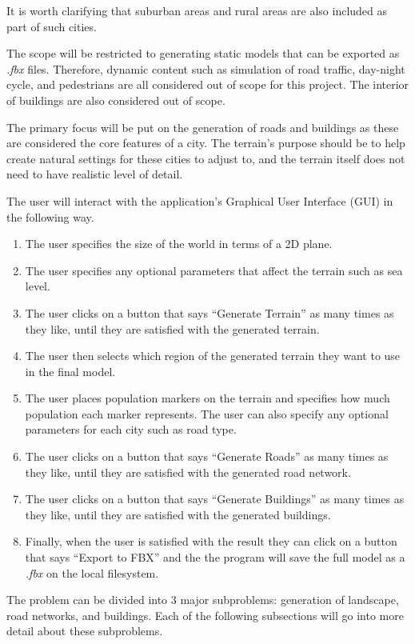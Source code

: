 It is worth clarifying that suburban areas and rural areas are also included as
part of such cities.

The scope will be restricted to generating static models that can be exported as \textit{.fbx} files.
Therefore, dynamic content such as simulation of road traffic, day-night cycle,
and pedestrians are all considered out of scope for this project.
The interior of buildings are also considered out of scope.

The primary focus will be put on the generation of roads and buildings as these
are considered the core features of a city.
The terrain's purpose should be to help create natural
settings for these cities to adjust to, and the terrain itself does not need
to have realistic level of detail.

The user will interact with the application's Graphical User Interface (GUI) in the following way.
\begin{enumerate}
  \item The user specifies the size of the world in terms of a 2D plane.
  \item The user specifies any optional parameters that affect the terrain
    such as sea level.
  \item The user clicks on a button that says ``Generate Terrain'' as many times
    as they like, until they are satisfied with the generated terrain.
  \item The user then selects which region of the generated terrain they want to use in the final model.
  \item The user places population markers on the terrain and specifies how much
    population each marker represents. The user can also specify any optional
    parameters for each city such as road type.
  \item The user clicks on a button that says ``Generate Roads'' as many times
    as they like, until they are satisfied with the generated road network.
  \item The user clicks on a button that says ``Generate Buildings'' as many times
    as they like, until they are satisfied with the generated buildings.
  \item Finally, when the user is satisfied with the result they can click on a
    button that says ``Export to FBX'' and the the program will save the full
    model as a \textit{.fbx} on the local filesystem.
\end{enumerate}

The problem can be divided into 3 major subproblems: generation of landscape, road networks, and buildings.
Each of the following subsections will go into more detail about these subproblems.

